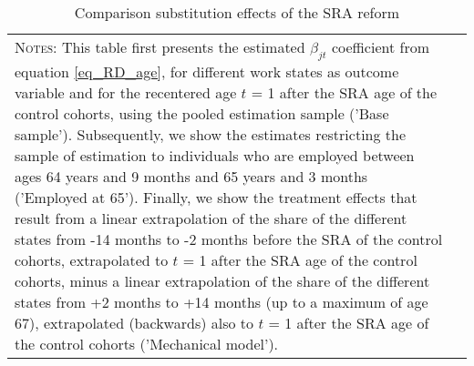 \documentclass[12pt,a4paper]{article}
\begin{document}
\begin{table}[!t]	
	\caption{Comparison substitution effects of the SRA reform}
	\footnotesize
	\label{table_RD_substitution}
	\begin{adjustbox}{max width = \textwidth, max totalheight=.7\textheight, keepaspectratio}
		\hspace*{-1cm}
		
		\hspace*{-1cm}
	\end{adjustbox}
	\vspace*{0.2cm}
	\scriptsize
	\begin{tabular}{ll}
		\begin{minipage}{14cm}%
	\textsc{Notes:}  This table first presents the estimated $\beta_{jt}$ coefficient from equation \ref{eq_RD_age}, for different work states as outcome variable and for the recentered age $t$ = 1 after the SRA age of the control cohorts, using the pooled estimation sample ('Base sample'). Subsequently, we show the estimates restricting the sample of estimation to individuals who are employed between ages 64 years and 9 months and 65 years and 3 months ('Employed at 65'). Finally, we show the treatment effects that result from a linear extrapolation of the share of the different states from -14 months to -2 months before the SRA of the control cohorts, extrapolated to $t$ = 1 after the SRA age of the control cohorts, minus a linear extrapolation of the share of the different states from +2 months to +14 months (up to a maximum of age 67), extrapolated (backwards) also to $t$ = 1 after the SRA age of the control cohorts ('Mechanical model').
		\end{minipage}%
	\end{tabular}
	\normalsize
\end{table}
\end{document}
